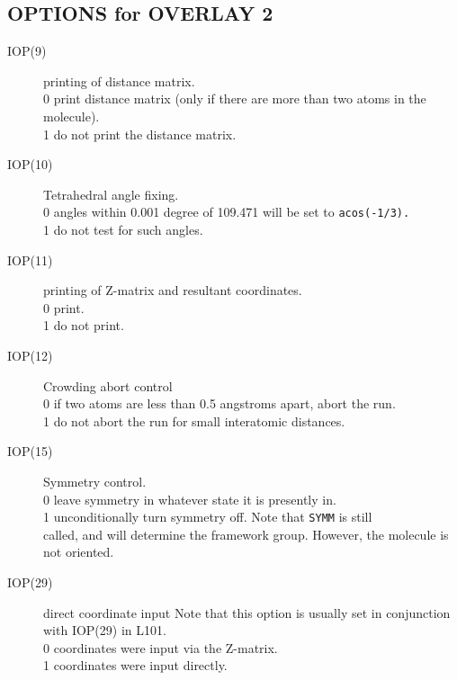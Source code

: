 \subsection{\sf OPTIONS for OVERLAY 2}
\begin{description}
\item[IOP(9)]  printing of distance matrix. \\
0  print distance matrix (only if there are more than 
two atoms in the molecule). \\
1  do not print the distance matrix. \\
\item[IOP(10)]  Tetrahedral angle fixing.  \\
0  angles within 0.001 degree of 109.471 will be set to
{\tt acos(-1/3).} \\
1  do not test for such angles. \\
\item[IOP(11)]  printing of Z-matrix and resultant coordinates.  \\
0  print. \\
1  do not print. \\
\item[IOP(12)]  Crowding abort control  \\
0  if two atoms are less than 0.5 angstroms apart, abort the run. \\
1  do not abort the run for small interatomic distances. \\
\item[IOP(15)]  Symmetry control.  \\
0  leave symmetry in whatever state it is presently in. \\
1  unconditionally turn symmetry off. Note that {\tt SYMM} is still \\
called, and will determine the framework group.  However, the
molecule is not oriented.
\item[IOP(29)]  direct coordinate input
Note that this option is usually set in conjunction with
IOP(29) in L101.  \\
0  coordinates were input via the Z-matrix. \\
1  coordinates were input directly. \\
\end{description}
